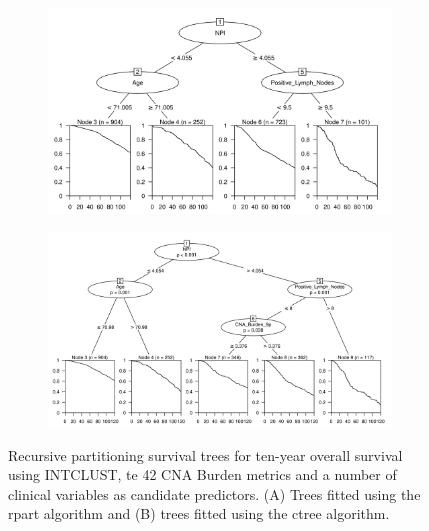 \begin{figure}[!htb]
\centering

\vspace{1cm}

\begin{subfigure}{\textwidth}
\subcaption{}
\includegraphics[width=1\textwidth]{../figures/Appendices/Appendix_B/Clin_PA_PartyKit_Survival_Burden_TenYearOS_INTCLUST.png}
\end{subfigure}

\vspace{2cm}

\begin{subfigure}{\textwidth}
\subcaption{}
\includegraphics[width=1\textwidth]{../figures/Appendices/Appendix_B/Clin_PA_Ctree_Survival_Burden_TenYearOS_INTCLUST.png}
\end{subfigure}

\vspace{1cm}

\caption[Recursive partitioning survival trees for ten-year overall survival using INTCLUST, the 42 CNA Burden metrics and a number of clinical variables as candidate predictors.]{Recursive partitioning survival trees for ten-year overall survival using INTCLUST, te 42 CNA Burden metrics and a number of clinical variables as candidate predictors. (A) Trees fitted using the rpart algorithm and (B) trees fitted using the ctree algorithm.}
\end{figure}
\FloatBarrier


